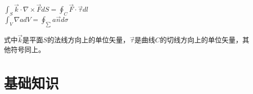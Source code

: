 \documentclass[cn, twoside]{myModel}
\begin{document}
\begin{cnabstract}
\begin{itemize}
\begin{minipage}{6cm}
					 {$\displaystyle\int_{S}\overrightarrow{k}\cdot\nabla\times\overrightarrow{F}dS
					 =\displaystyle\oint_{C}\overrightarrow{F}\cdot\overrightarrow{\tau}dl$} \\
					 {$\displaystyle\int_{V}\nabla{}adV=\displaystyle\oint_{\sum}a\overrightarrow{n}d\sigma$}
				\end{minipage}
				\begin{minipage}{9.5cm}
					\raggedright
					{
						式中$\overrightarrow{k}$是平面$S$的法线方向上的单位矢量，$\overrightarrow{\tau}$是曲线$C$的切线方向上的单位矢量，其他符号同上。
					}
				\end{minipage}
			\end{itemize}
	\end{cnabstract}
	
	\newpage
	\large
	\section{基础知识}
\end{document}
